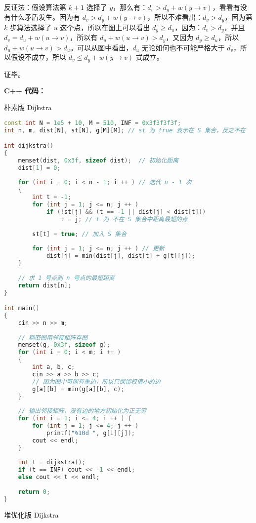 反证法：假设算法第 $k + 1$ 选择了 $y$，那么有：$d_v > d_y + w(y \to v)$，看看有没有什么矛盾发生。因为有 $d_v > d_y + w(y \to v)$，所以不难看出：$d_v > d_y$，因为第 $k$ 步算法选择了 $u$ 这个点，所以在图上可以看出 $d_y \geq d_u$，因为：$d_v > d_y$，并且 $d_v = d_u + w(u \to v)$，所以有 $d_u + w(u \to v) > d_y$，又因为 $d_y \geq d_u$，所以 $d_u + w(u \to v) > d_u$。可以从图中看出，$d_u$ 无论如何也不可能严格大于 $d_v$，所以假设不成立，所以 $d_v \leq d_y + w(y \to v)$ 式成立。 

证毕。

\textbf{C++ 代码：}

朴素版 Dijkstra
\begin{lstlisting}[language=cpp]
const int N = 1e5 + 10, M = 510, INF = 0x3f3f3f3f;
int n, m, dist[N], st[N], g[M][M]; // st 为 true 表示在 S 集合，反之不在

int dijkstra()
{
    memset(dist, 0x3f, sizeof dist);  // 初始化距离
    dist[1] = 0;
    
    for (int i = 0; i < n - 1; i ++ ) // 迭代 n - 1 次
    {
        int t = -1;
        for (int j = 1; j <= n; j ++ )
            if (!st[j] && (t == -1 || dist[j] < dist[t]))
                t = j; // t 为 不在 S 集合中距离最短的点
        
        st[t] = true; // 加入 S 集合
        
        for (int j = 1; j <= n; j ++ ) // 更新
            dist[j] = min(dist[j], dist[t] + g[t][j]);
    }
    
    // 求 1 号点到 n 号点的最短距离
    return dist[n];
}

int main()
{
    cin >> n >> m;
    
    // 稠密图用邻接矩阵存图
    memset(g, 0x3f, sizeof g);
    for (int i = 0; i < m; i ++ ) 
    {
        int a, b, c;
        cin >> a >> b >> c;
        // 因为图中可能有重边，所以只保留权值小的边
        g[a][b] = min(g[a][b], c);
    }
    
    // 输出邻接矩阵，没有边的地方初始化为正无穷
    for (int i = 1; i <= 4; i ++ ) {
        for (int j = 1; j <= 4; j ++ )
            printf("%10d ", g[i][j]);
        cout << endl;
    }
    
    int t = dijkstra();
    if (t == INF) cout << -1 << endl; 
    else cout << t << endl;
    
    return 0;
}
\end{lstlisting}

堆优化版 Dijkstra

